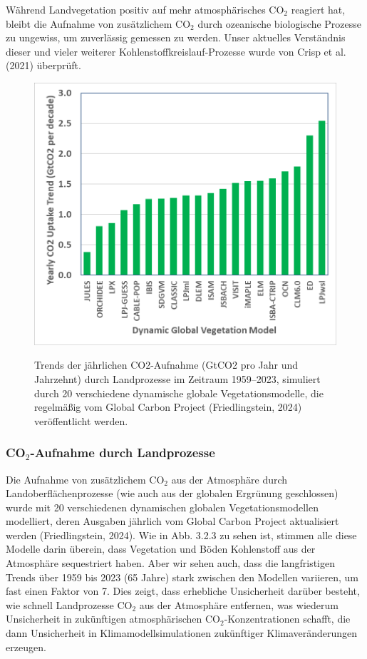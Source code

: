 \documentclass[12pt,paper=a4,DIV=12,parskip=never,chapterprefix=false,headings=standardclasses]{scrreprt}
\numberwithin{figure}{chapter}
\begin{document}
Während Landvegetation positiv auf mehr atmosphärisches CO$_2$ reagiert hat, bleibt die Aufnahme von zusätzlichem CO$_2$ durch ozeanische biologische Prozesse zu ungewiss, um zuverlässig gemessen zu werden. Unser aktuelles Verständnis dieser und vieler weiterer Kohlenstoffkreislauf-Prozesse wurde von Crisp et al. (2021) überprüft.

\begin{figure}[H]
\begin{center}
\includegraphics[width=1.0\textwidth]{bilder/bilderKlima-0013.png}\\[1cm]
\end{center}
\caption{Trends der jährlichen CO2-Aufnahme (GtCO2 pro Jahr und Jahrzehnt) durch Landprozesse
im Zeitraum 1959–2023, simuliert durch 20 verschiedene dynamische globale Vegetationsmodelle, die regelmäßig
vom Global Carbon Project (Friedlingstein, 2024) veröffentlicht werden.}
\end{figure}

\subsubsection*{CO$_2$-Aufnahme durch Landprozesse}
Die Aufnahme von zusätzlichem CO$_2$ aus der Atmosphäre durch Landoberflächenprozesse (wie auch aus der globalen Ergrünung geschlossen) wurde mit 20 verschiedenen dynamischen globalen Vegetationsmodellen modelliert, deren Ausgaben jährlich vom Global Carbon Project aktualisiert werden (Friedlingstein, 2024). Wie in Abb. 3.2.3 zu sehen ist, stimmen alle diese Modelle darin überein, dass Vegetation und Böden Kohlenstoff aus der Atmosphäre sequestriert haben. Aber wir sehen auch, dass die langfristigen Trends über 1959 bis 2023 (65 Jahre) stark zwischen den Modellen variieren, um fast einen Faktor von 7. Dies zeigt, dass erhebliche Unsicherheit darüber besteht, wie schnell Landprozesse CO$_2$ aus der Atmosphäre entfernen, was wiederum Unsicherheit in zukünftigen atmosphärischen CO$_2$-Konzentrationen schafft, die dann Unsicherheit in Klimamodellsimulationen zukünftiger Klimaveränderungen erzeugen.
\end{document}
